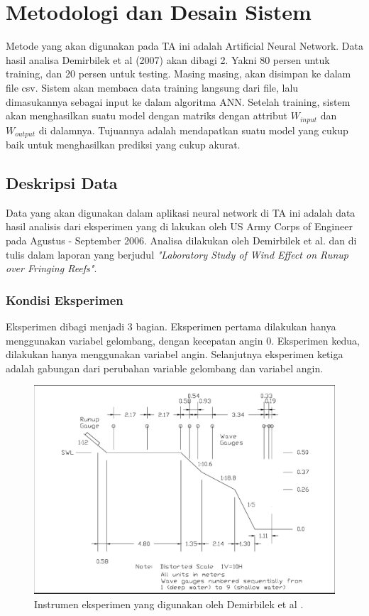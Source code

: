 \chapter{Metodologi dan Desain Sistem}
  Metode yang akan digunakan pada TA ini adalah Artificial Neural Network. Data hasil analisa Demirbilek et al (2007) \cite{DemirbilekReport} akan dibagi 2. Yakni 80 persen untuk training, dan 20 persen untuk testing. Masing masing, akan disimpan ke dalam file csv. Sistem akan membaca data training langsung dari file, lalu dimasukannya sebagai input ke dalam algoritma ANN. Setelah training, sistem akan menghasilkan suatu model dengan matriks dengan attribut $W_{input}$ dan $W_{output}$ di dalamnya. Tujuannya adalah mendapatkan suatu model yang cukup baik untuk menghasilkan prediksi yang cukup akurat.

\section{Deskripsi Data}
  Data yang akan digunakan dalam aplikasi neural network di TA ini adalah data hasil analisis dari eksperimen yang di lakukan oleh US Army Corps of Engineer pada Agustus - September 2006. Analisa dilakukan oleh Demirbilek et al. dan di tulis dalam laporan yang berjudul \emph{"Laboratory Study of Wind Effect on Runup over Fringing Reefs"}.

\subsection{Kondisi Eksperimen}
\label{kondisiEksperimen}

  Eksperimen dibagi menjadi 3 bagian. Eksperimen pertama dilakukan hanya menggunakan variabel gelombang, dengan kecepatan angin 0. Eksperimen kedua, dilakukan hanya menggunakan variabel angin. Selanjutnya eksperimen ketiga adalah gabungan dari perubahan variable gelombang dan variabel angin.

  \begin{figure}
    \begin{center}
      \includegraphics[scale=0.2]{./images/instrumen_eksperimen.png}
    \end{center}
    \caption{Instrumen eksperimen yang digunakan oleh Demirbilek et al \cite{DemirbilekReport}.}
    \label{fig:intrumen_demirbilek}
  \end{figure}
  \FloatBarrier

